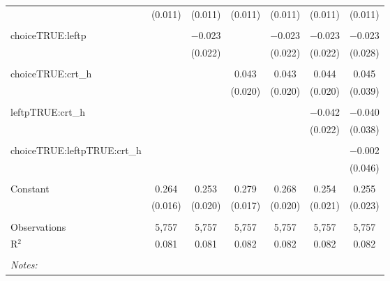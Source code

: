 \begin{table}[!htbp]
\begin{tabular}{@{\extracolsep{5pt}}lcccccc}
  & (0.011) & (0.011) & (0.011) & (0.011) & (0.011) & (0.011) \\ 
  & & & & & & \\ 
 choiceTRUE:leftp &  & $-$0.023 &  & $-$0.023 & $-$0.023 & $-$0.023 \\ 
  &  & (0.022) &  & (0.022) & (0.022) & (0.028) \\ 
  & & & & & & \\ 
 choiceTRUE:crt\_h &  &  & 0.043 & 0.043 & 0.044 & 0.045 \\ 
  &  &  & (0.020) & (0.020) & (0.020) & (0.039) \\ 
  & & & & & & \\ 
 leftpTRUE:crt\_h &  &  &  &  & $-$0.042 & $-$0.040 \\ 
  &  &  &  &  & (0.022) & (0.038) \\ 
  & & & & & & \\ 
 choiceTRUE:leftpTRUE:crt\_h &  &  &  &  &  & $-$0.002 \\ 
  &  &  &  &  &  & (0.046) \\ 
  & & & & & & \\ 
 Constant & 0.264 & 0.253 & 0.279 & 0.268 & 0.254 & 0.255 \\ 
  & (0.016) & (0.020) & (0.017) & (0.020) & (0.021) & (0.023) \\ 
  & & & & & & \\ 
Observations & 5,757 & 5,757 & 5,757 & 5,757 & 5,757 & 5,757 \\ 
R$^{2}$ & 0.081 & 0.081 & 0.082 & 0.082 & 0.082 & 0.082 \\ 
\hline \\[-1.8ex] 
\textit{Notes:} & \multicolumn{6}{l}{} \\ 
\end{tabular} 
\end{table} 
